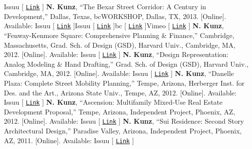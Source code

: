 \documentclass{article}
\begin{document}
        \faBook\space Issuu [ \href{https://issuu.com/nickkunz/docs/asthma}{\texttt{Link}} ]\newline\newline
        \textbf{N. Kunz}, ``The Bexar Street Corridor: A Century in Development,'' Dallas, Texas, bcWORKSHOP, Dallas, TX, 2013. [Online]. Available:\newline\newline
        \faBook\space Issuu [ \href{https://issuu.com/nickkunz/docs/bexar_present}{\texttt{Link}} ]\space\faBook\space Issuu [ \href{https://issuu.com/nickkunz/docs/bexar}{\texttt{Link}} ]\space\faHome\space bc [ \href{https://www.bcworkshop.org/posts/bexar-street-corridor}{\texttt{Link}} ]\space\faVimeo\space Vimeo [ \href{https://vimeo.com/81649797}{\texttt{Link}} ]\newline\newline
        \textbf{N. Kunz}, ``Fenway-Kenmore Square: Comprehensive Planning \& Finance,'' Cambridge, Massachusetts, Grad. Sch. of Design (GSD), Harvard Univ., Cambridge, MA, 2012. [Online]. Available:\newline\newline
        \faBook\space Issuu [ \href{https://issuu.com/nickkunz/docs/fenway_kenmore}{\texttt{Link}} ]\newline\newline
        \textbf{N. Kunz}, ``Design Representation: Analog Modeling \& Hand Drafting,'' Grad. Sch. of Design (GSD), Harvard Univ., Cambridge, MA, 2012. [Online]. Available:\newline\newline
        \faBook\space Issuu [ \href{https://issuu.com/nickkunz/docs/design_rep}{\texttt{Link}} ]\newline\newline
        \textbf{N. Kunz}, ``Danelle Plaza: Complete Street Mobility Planning,'' Tempe, Arizona, Herberger Inst. for Des. and the Art., Arizona State Univ., Tempe, AZ, 2012. [Online]. Available:\newline\newline
        \faBook\space Issuu [ \href{https://issuu.com/nickkunz/docs/danelle_plaza}{\texttt{Link}} ]\newline\newline
        \textbf{N. Kunz}, ``Ascension: Multifamily Mixed-Use Real Estate Development Proposal,'' Tempe, Arizona, Independent Project, Phoenix, AZ, 2012. [Online]. Available:\newline\newline
        \faBook\space Issuu [ \href{https://issuu.com/nickkunz/docs/ascension}{\texttt{Link}} ]\newline\newline
        \textbf{N. Kunz}, ``Sui Residence: Second Story Architectural Design,'' Paradise Valley, Arizona, Independent Project, Phoenix, AZ, 2011. [Online]. Available:\newline\newline
        \faBook\space Issuu [ \href{https://issuu.com/nickkunz/docs/sui}{\texttt{Link}} ]
\end{document}
